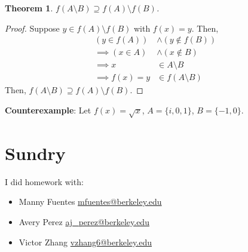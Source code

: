\documentclass{article}
\newtheorem{theorem}{Theorem}
\begin{document}
\begin{theorem}
    \(f(A \setminus B) \supseteq f(A) \setminus f(B)\).
\end{theorem}
\begin{proof}
    Suppose \(y \in f(A) \setminus f(B)\) with \(f(x) = y\).
    Then,
    \begin{align}
        (y \in f(A)) &\land (y \notin f(B)) \\
        \implies (x \in A) &\land (x \notin B) \\
        \implies x &\in A \setminus B \\
        \implies f(x) = y &\in f(A \setminus B)
    \end{align}
    Then, \(f(A \setminus B) \supseteq f(A) \setminus f(B)\).
\end{proof}
\textbf{Counterexample}: Let \(f(x) = \sqrt{x}\), \(A = \{i, 0, 1\}\), \(B = \{-1, 0\}\).

\section{Sundry}

I did homework with:
\begin{itemize}
    \item Manny Fuentes \href{mailto:mfuentes@berkeley.edu}{mfuentes@berkeley.edu}
    \item Avery Perez \href{mailto:aj_perez@berkeley.edu}{aj\_perez@berkeley.edu}
    \item Victor Zhang \href{mailto:vzhang6@berkeley.edu}{vzhang6@berkeley.edu}
\end{itemize}
\end{document}
